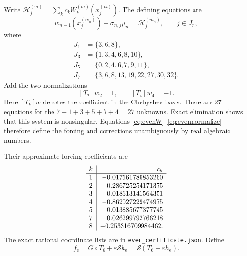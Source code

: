 \documentclass[11pt]{article}
\theoremstyle{remark}\newtheorem{remark}[theorem]{Remark}
\newcommand{\eps}{\varepsilon}
\begin{document}
Write $\mathcal H_j^{(m)}=\sum_k c_k W_k^{(m)}(x_j^{(m)})$.
The defining equations are
\begin{equation}\label{eq:evenlinear}
 w_{n-1}(x_j^{(m_n)})+\sigma_{n,j}\mu_n
 =\mathcal H_j^{(m_n)},\qquad j\in J_n,
\end{equation}
where
\begin{align*}
 J_1&=\{3,6,8\},\\
 J_3&=\{1,3,4,6,8,10\},\\
 J_5&=\{0,2,4,6,7,9,11\},\\
 J_7&=\{3,6,8,13,19,22,27,30,32\}.
\end{align*}
Add the two normalizations
\begin{equation}\label{eq:evennormalize}
 [T_2]w_2=1,\qquad [T_4]w_4=-1.
\end{equation}
Here $[T_k]w$ denotes the coefficient in the Chebyshev basis.
There are $27$ equations for the $7+1+3+5+7+4=27$ unknowns.
Exact elimination shows that this system is nonsingular. Equations
\eqref{eq:evenW}--\eqref{eq:evennormalize} therefore define the forcing
and corrections unambiguously by real algebraic numbers.

Their approximate forcing coefficients are
\[
\begin{array}{c|r}
 k&c_k\\\hline
 1&-0.017561786853260\cr
 2& 0.286725254171375\cr
 3& 0.018613141564351\cr
 4&-0.862027229474975\cr
 5&-0.013885677377745\cr
 7& 0.026299792766218\cr
 8&-0.253316709984462.
\end{array}
\]
The exact rational coordinate lists are in \texttt{even\_certificate.json}.
Define
\begin{equation}\label{eq:fe}
 f_{\mathrm{e}}=G\circ T_6+\eps\mathcal S h_{\mathrm{e}}
 =\mathcal S(T_6+\eps h_{\mathrm{e}}).
\end{equation}
\end{document}
